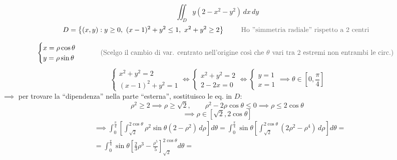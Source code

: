 \begin{esercizio}[EXE 2]
\[
\iint_D y(2 - x^2 - y^2)\, dx\, dy
\]
\[
D = \left\{ (x, y) : y \ge 0, \ (x - 1)^2 + y^2 \le 1, \ x^2 + y^2 \ge 2 \right\} \qquad \text{\pencilnote{Ho ''simmetria radiale'' rispetto a 2 centri}}
\]
\begin{center}
\end{center}
\[
\begin{cases}
x = \rho \cos \theta \\
y = \rho \sin \theta
\end{cases}
\qquad \text{\pencilnote{(Scelgo il cambio di var. centrato nell'origine così che $\theta$ vari tra 2 estremi non entrambi le circ.)}}
\]
\[
\begin{cases}
x^2 + y^2 = 2 \\
(x - 1)^2 + y^2 = 1
\end{cases}
\iff
\begin{cases}
x^2 + y^2 = 2 \\
2 - 2x = 0
\end{cases}
\iff
\begin{cases}
y = 1 \\
x = 1
\end{cases}
\implies \theta \in \left[0, \frac{\pi}{4}\right]
\]
$\implies$ per trovare la ``dipendenza''  nella parte ``esterna'', sostituisco le eq. in $D$:
\[
\rho^2 \ge 2 \implies \rho \ge \sqrt{2}, \qquad \rho^2 - 2\rho \cos \theta \le 0 \implies \rho \le 2 \cos \theta
\]
\[
\implies \rho \in [\sqrt{2}, 2 \cos \theta]
\]
\begin{align*}
&\implies \int_0^{\frac{\pi}{4}} \left[ \int_{\sqrt{2}}^{2 \cos \theta} \rho^2 \sin \theta (2 - \rho^2)\, d\rho \right] d\theta = \int_0^{\frac{\pi}{4}} \sin \theta \left[ \int_{\sqrt{2}}^{2 \cos \theta} (2\rho^2 - \rho^4)\, d\rho \right] d\theta = \\[6pt]
&= \int_0^{\frac{\pi}{4}} \sin \theta \left[ \frac{2}{3}\rho^3 - \frac{\rho^5}{5} \right]_{\sqrt{2}}^{2 \cos \theta} d\theta =
\end{align*}
\end{esercizio}



